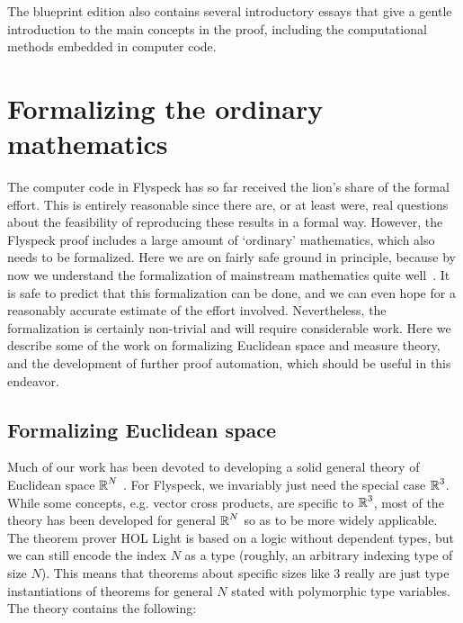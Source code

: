 \documentclass[11pt]{amsart}
\newcommand{\real}{\mbox{$\protect\mathbb R$}}
\begin{document}
The blueprint edition also contains several introductory essays that give a gentle introduction
to the main concepts in the proof, including the computational methods embedded in computer code.




\section{Formalizing the ordinary mathematics}
\label{sec:ordinary}

The computer code in Flyspeck has so far received the lion's share of the
formal effort. This is entirely reasonable since there are, or at least were,
real questions about the feasibility of reproducing these results in a formal
way. However, the Flyspeck proof includes a large amount of `ordinary'
mathematics, which also needs to be formalized. Here we are on fairly safe
ground in principle, because by now we understand the formalization of
mainstream mathematics quite well~\cite{wiedijk-17}. It is safe to predict that
this formalization can be done, and we can even hope for a reasonably accurate
estimate of the effort involved. Nevertheless, the formalization is certainly
non-trivial and will require considerable work. Here we describe some of the
work on formalizing Euclidean space and measure theory, and the development of
further proof automation, which should be useful in this endeavor.

\subsection*{Formalizing Euclidean space}

Much of our work has been devoted to developing a solid general theory of
Euclidean space $\real^N$ \cite{harrison-euclidean}. For Flyspeck, we
invariably just need the special case $\real^3$. While some concepts, e.g.
vector cross products, are specific to $\real^3$, most of the theory has been
developed for general $\real^N$ so as to be more widely applicable. The theorem
prover HOL Light \cite{harrison-demo} is based on a logic without dependent
types, but we can still encode the index $N$ as a type (roughly, an arbitrary
indexing type of size $N$). This means that theorems about specific sizes like
$3$ really are just type instantiations of theorems for general $N$ stated with
polymorphic type variables. The theory contains the following:
\end{document}
